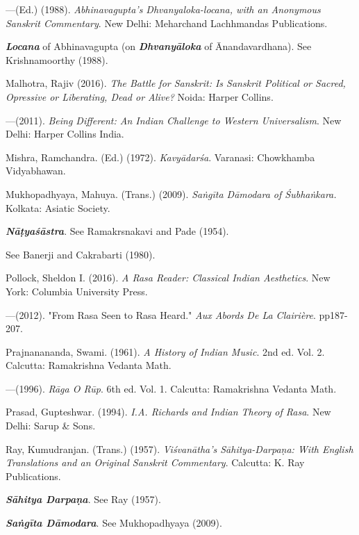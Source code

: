 \begin{thebibliography}{99}
---\kern3pt(Ed.) (1988). \textsl{Abhinavagupta's Dhvanyaloka-locana, with an Anonymous Sanskrit Commentary}. New Delhi: Meharchand Lachhmandas Publications. 

{\sl\bfseries Locana} of Abhinavagupta (on {\sl\bfseries Dhvanyāloka} of Ānandavardhana). See Krishnamoorthy (1988).

Malhotra, Rajiv (2016). \textsl{The Battle for Sanskrit: Is Sanskrit Political or Sacred, Opressive or Liberating, Dead or Alive?} Noida: Harper Collins.

---\kern3pt(2011). \textsl{Being Different: An Indian Challenge to Western Universalism}. New Delhi: Harper Collins India. 

Mishra, Ramchandra. (Ed.) (1972). \textsl{Kavyādarśa}. Varanasi: Chowkhamba Vidyabhawan.

Mukhopadhyaya, Mahuya. (Trans.) (2009). \textsl{Saṅgīta Dāmodara of Śubhaṅkara.} Kolkata: Asiatic Society. 

{\sl\bfseries Nāṭyaśāstra}. See Ramakrsnakavi and Pade (1954).

See Banerji and Cakrabarti (1980).

Pollock, Sheldon I. (2016). \textsl{A Rasa Reader: Classical Indian Aesthetics}. New York: Columbia University Press. 

---\kern3pt(2012). "From Rasa Seen to Rasa Heard." \textsl{Aux Abords De La Clairière}. pp187-207. 

Prajnanananda, Swami. (1961). \textsl{A History of Indian Music}. 2nd ed. Vol. 2. Calcutta: Ramakrishna Vedanta Math. 

---\kern3pt(1996). \textsl{Rāga O Rūp}. 6th ed. Vol. 1. Calcutta: Ramakrishna Vedanta Math. 

Prasad, Gupteshwar. (1994). \textsl{I.A. Richards and Indian Theory of Rasa}. New Delhi: Sarup \& Sons.

Ray, Kumudranjan. (Trans.) (1957). \textsl{Viśvanātha's Sāhitya-Darpaṇa: With English Translations and an Original Sanskrit Commentary}. Calcutta: K. Ray Publications. 

{\sl\bfseries Sāhitya Darpaṇa}. See Ray (1957).

{\sl\bfseries Saṅgīta Dāmodara}. See Mukhopadhyaya (2009).


\end{thebibliography}
